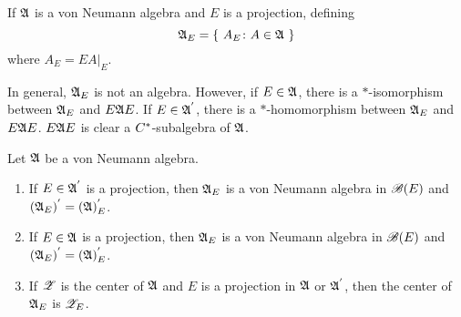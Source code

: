 \begin{defn}
	If $\mathfrak{A}$ is a von Neumann algebra and $E$ is a projection, defining
	\begin{equation*}
		\mathfrak{A}_{E} = \{~A_E \colon A \in \mathfrak{A}~\}
	\end{equation*}
	where $A_E = EA|_E$.
\end{defn}
\begin{rem}
	In general, $\mathfrak{A}_E$ is not an algebra. However, if $E \in \mathfrak{A}$, there is a $*$-isomorphism between $\mathfrak{A}_E$ and $E\mathfrak{A} E$. If $E \in \mathfrak{A}^{'}$, there is a $*$-homomorphism between $\mathfrak{A}_E$ and $E\mathfrak{A} E$. $E \mathfrak{A} E$ is clear a $C^{*}$-subalgebra of $\mathfrak{A}$.
\end{rem}

\begin{prop} \label{prop20}
	Let $\mathfrak{A}$ be a von Neumann algebra.
	\begin{enumerate}[label=\arabic*)]
		\item If $E \in \mathfrak{A}^{'}$ is a projection, then $\mathfrak{A}_E$ is a von Neumann algebra in $\mathscr{B}(E)$ and $(\mathfrak{A}_E)^{'} = (\mathfrak{A})^{'}_E$.
		\item If $E \in \mathfrak{A}$ is a projection, then $\mathfrak{A}_E$ is a von Neumann algebra in $\mathscr{B}(E)$ and $(\mathfrak{A}_E)^{'} = (\mathfrak{A})^{'}_E$.
		\item If $\mathscr{Z}$ is the center of $\mathfrak{A}$ and $E$ is a projection in $\mathfrak{A}$ or $\mathfrak{A}^{'}$, then the center of $\mathfrak{A}_E$ is $\mathscr{Z}_E$.
	\end{enumerate}
\end{prop}
